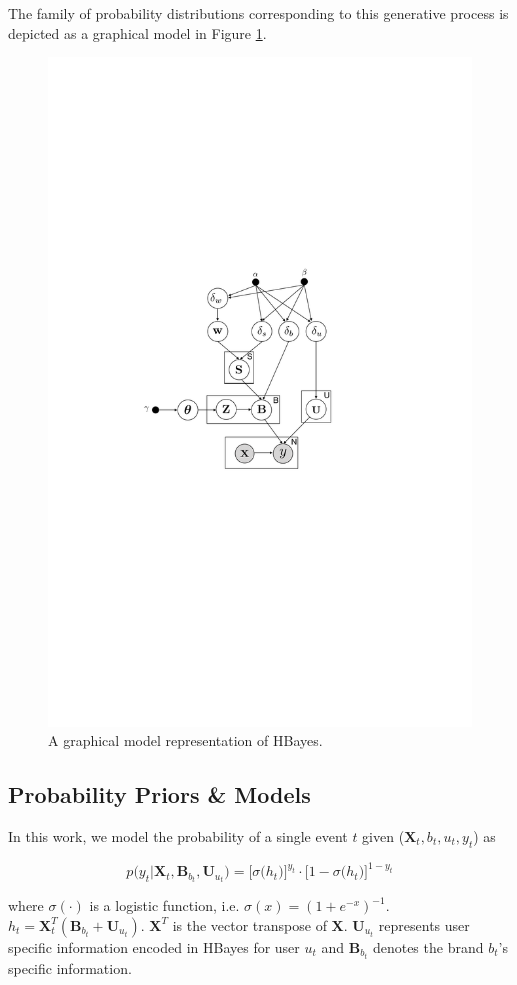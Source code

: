 The family of probability distributions corresponding to this generative process is depicted as a graphical model in Figure \ref{fig:model}.

\begin{figure}[htb]
\centering
\includegraphics[width=0.6\linewidth]{fig/model}
\caption{A graphical model representation of HBayes.}
\label{fig:model}
\end{figure}

\subsection{Probability Priors \& Models}

In this work, we model the probability of a single event $t$ given ($\mathbf{X}_t, b_t, u_t, y_t$) as 

\begin{equation}
\label{eq:sigmoid_prob}
p\big(y_t|\bm{X}_t,\bm{B}_{b_t},\bm{U}_{u_t} \big)= \Big[\sigma\big(h_t\big)\Big]^{y_t} \cdot \Big[1-\sigma\big(h_t\big)\Big]^{1-y_t}
\end{equation}

\noindent where $\sigma(\cdot)$ is a logistic function, i.e. $\sigma(x)=(1+e^{-x})^{-1}$. $h_{t}=\bm{X}_t^T(\bm{B}_{b_t}+\bm{U}_{u_t})$. $\mathbf{X}^T$ is the vector transpose of $\mathbf{X}$. $\bm{U}_{u_t}$ represents user specific information encoded in HBayes for user $u_t$ and $\bm{B}_{b_t}$ denotes the brand $b_t$'s specific information.

